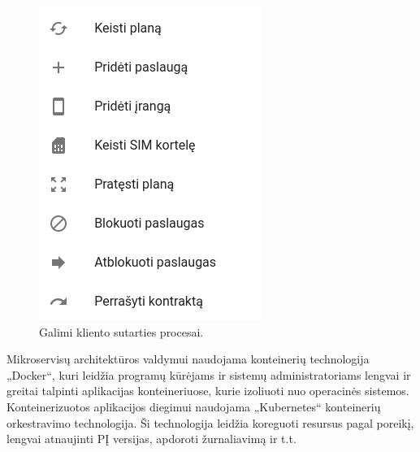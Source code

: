 \begin{figure}[H]
    \centering
    \includegraphics[scale=0.4]{img/options.png}
    \caption{Galimi kliento sutarties procesai.}
    \label{img:options}
\end{figure}

Mikroservisų architektūros valdymui naudojama konteinerių technologija „Docker“, kuri leidžia programų kūrėjams ir sistemų administratoriams lengvai ir greitai
talpinti aplikacijas konteineriuose, kurie izoliuoti nuo operacinės sistemos. Konteinerizuotos aplikacijos diegimui naudojama „Kubernetes“ konteinerių orkestravimo technologija.
Ši technologija leidžia koreguoti resursus pagal poreikį, lengvai atnaujinti PĮ versijas, apdoroti žurnaliavimą ir t.t.
